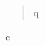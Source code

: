 \documentclass[11pt]{article}
\author{Au}
\date{2026-01-01}
\title{}
\begin{document}
\tableofcontents

\begin{quotation}
q
\end{quotation}

\begin{center}
c
\end{center}
\end{document}

